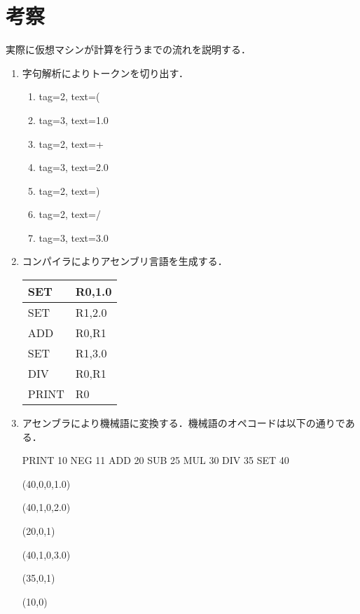 \documentclass[a4j]{jsarticle}  %
\begin{document}
\section{考察}
実際に仮想マシンが計算を行うまでの流れを説明する．
\begin{enumerate}
\item 字句解析によりトークンを切り出す．
\begin{enumerate}
\item tag=2, text=(
\item tag=3, text=1.0
\item tag=2, text=+
\item tag=3, text=2.0
\item tag=2, text=)
\item tag=2, text=/
\item tag=3, text=3.0
\end{enumerate}
\item コンパイラによりアセンブリ言語を生成する．
\begin{table}[htb]
  \begin{center}
\begin{tabular}{ll} \hline
SET & R0,1.0 \\ \hline
SET & R1,2.0 \\
ADD & R0,R1 \\
SET & R1,3.0 \\
DIV & R0,R1 \\
PRINT & R0  \\ \hline
\end{tabular} 
\end{center}
\end{table}

\item アセンブラにより機械語に変換する．機械語のオペコードは以下の通りである．
\begin{shadebox}
PRINT 10
NEG 11
ADD 20
SUB 25
MUL 30
DIV 35
SET 40
\end{shadebox}
(40,0,0,1.0)

(40,1,0,2.0)

(20,0,1)

(40,1,0,3.0)

(35,0,1)

(10,0)

\end{enumerate}
\end{document}
